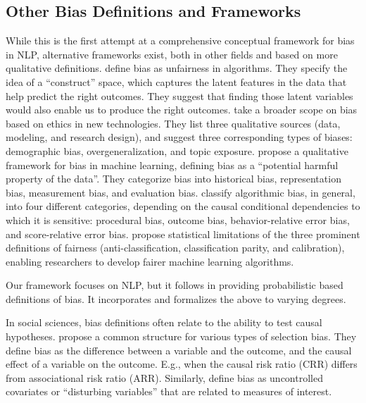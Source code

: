\documentclass[11pt,a4paper]{article}
\begin{document}
\subsection{Other Bias Definitions and Frameworks}
While this is the first attempt at a comprehensive conceptual framework for bias in NLP, alternative frameworks exist, both in other fields and based on more qualitative definitions.
 define bias as unfairness in algorithms. They specify the idea of a ``construct'' space, which captures the latent features in the data that help predict the right outcomes. 
They suggest that finding those latent variables would also enable us to produce the right outcomes.
 take a broader scope on bias based on ethics in new technologies. They list three qualitative sources (data, modeling, and research design), and suggest three corresponding types of biases: demographic bias, overgeneralization, and topic exposure.
 propose a qualitative framework for bias in machine learning, defining bias as a ``potential harmful property of the data''. They categorize bias into historical bias, representation bias, measurement bias, and evaluation bias. 
 classify algorithmic bias, in general, into four different categories, depending on the causal conditional dependencies to which it is sensitive: procedural bias, outcome bias, behavior-relative error bias, and score-relative error bias. 
 propose statistical limitations of the three prominent definitions of fairness (anti-classification, classification parity, and calibration), enabling researchers to develop fairer machine learning algorithms.

Our framework focuses on NLP, but it follows  in providing probabilistic based definitions of bias. It incorporates and formalizes the above to varying degrees.

In social sciences, bias definitions often relate to the ability to test causal hypotheses. 
 propose a common structure for various types of selection bias. They define bias as the difference between a variable and the outcome, and the causal effect of a variable on the outcome. E.g., when the causal risk ratio (CRR) differs from associational risk ratio (ARR). 
Similarly,  define bias as uncontrolled covariates or ``disturbing variables'' that are related to measures of interest.
\end{document}
